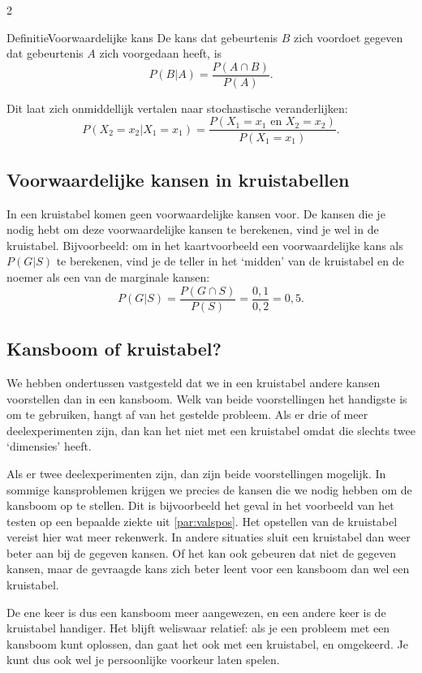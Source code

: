 \begin{multicols} {2}
\begin{kader}{Definitie}{Voorwaardelijke kans}
De kans dat gebeurtenis $B$ zich voordoet gegeven dat gebeurtenis $A$ zich voorgedaan heeft, is
$$P(B|A)=\frac {P(A \cap B)} {P(A)}.$$
\end{kader}

Dit laat zich onmiddellijk vertalen naar stochastische veranderlijken:
$$P(X_2=x_2|X_1=x_1)=\frac {P(X_1=x_1 \text{ en } X_2=x_2)} {P(X_1=x_1)}.$$

\subsection*{Voorwaardelijke kansen in kruistabellen}

In een kruistabel komen geen voorwaardelijke kansen voor. De kansen die je nodig hebt om deze voorwaardelijke kansen te berekenen, vind je wel in de kruistabel. Bijvoorbeeld: om in het kaartvoorbeeld een voorwaardelijke kans als $P(G|S)$ te berekenen, vind je de teller in het ‘midden’ van de kruistabel en de noemer als een van de marginale kansen:
$$P(G|S)=\frac {P(G \cap S)} {P(S)} = \frac {0,1} {0,2}=0,5.$$

\subsection*{Kansboom of kruistabel?}

We hebben ondertussen vastgesteld dat we in een kruistabel andere kansen voorstellen dan in een kansboom. Welk van beide voorstellingen het handigste is om te gebruiken, hangt af van het gestelde probleem. Als er drie of meer deelexperimenten zijn, dan kan het niet met een kruistabel omdat die slechts twee ‘dimensies’ heeft. 

Als er twee deelexperimenten zijn, dan zijn beide voorstellingen mogelijk. In sommige kansproblemen krijgen we precies de kansen die we nodig hebben om de kansboom op te stellen. Dit is bijvoorbeeld het geval in het voorbeeld van het testen op een bepaalde ziekte uit \autoref{par:valspos}. Het opstellen van de kruistabel vereist hier wat meer rekenwerk. In andere situaties sluit een kruistabel dan weer beter aan bij de gegeven kansen. Of het kan ook gebeuren dat niet de gegeven kansen, maar de gevraagde kans zich beter leent voor een kansboom dan wel een kruistabel.

De ene keer is dus een kansboom meer aangewezen, en een andere keer is de kruistabel handiger. Het blijft weliswaar relatief: als je een probleem met een kansboom kunt oplossen, dan gaat het ook met een kruistabel, en omgekeerd. Je kunt dus ook wel je persoonlijke voorkeur laten spelen.


\end{multicols}
